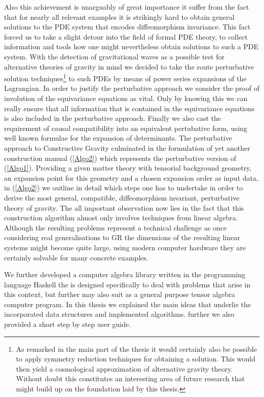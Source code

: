 \documentclass[a4paper,12pt, DIV=14, BCOR=5mm, twoside, headsepline, numbers=noenddot]{scrbook}
\begin{document}
Also this achievement is unarguably of great importance it suffer from the fact that for nearly all relevant examples it is strikingly hard to obtain general solutions to the 
PDE system that encodes diffeomorphism invariance. 
This fact forced us to take a slight detour into the field of formal PDE theory, to collect information and tools how one might nevertheless obtain solutions to such a PDE system. 
With the detection of gravitational waves as a possible test for alternative theories of gravity in mind we decided to take the route perturbative solution techniques\footnote{As remarked in the main part of the thesis it would certainly also be possible to apply symmetry reduction techniques for obtaining a solution. This would then yield a cosmological approximation of alternative gravity theory. Without doubt this constitutes an interesting area of future research that might build up on the foundation laid by this thesis.} to such PDEs by means of power series expansions of the Lagrangian. In order to justify the perturbative approach we consider the proof of involution of the equivariance equations
as vital. Only by knowing this we can really ensure that all information that is contained in the equivariance equations is also included in the perturbative approach. 
Finally we also cast the requirement of causal compatibility into an equivalent pertubative form, using well known formulae for the expansion of determinants. The perturbative approach to Constructive Gravity culminated in the formulation of yet another construction manual (\ref{Algo2}) which represents the perturbative version of (\ref{Algo1}). Providing a given matter theory with tensorial background geometry, an expansion point for this geometry and a chosen expansion order as input data, in (\ref{Algo2}) we outline in detail which steps one has to undertake in order to derive the most general, compatible, diffeomorphism invariant, perturbative theory of gravity. The all important observation now lies in the fact that this construction algorithm almost only involves techniques from linear algebra. Although the resulting problems represent a technical challenge as once considering real generalisations to GR the dimensions of the resulting linear systems might become quite large, using modern computer hardware they are certainly solvable for many concrete examples. 

We further developed a computer algebra library written in the programming language Haskell the is designed specifically to deal with problems that arise in this context, but further may also suit as a general purpose tensor algebra computer program. 
In this thesis we explained the main ideas that underlie the incorporated data structures and implemented algorithms. further we also provided a short step by step user guide. 
\end{document}
